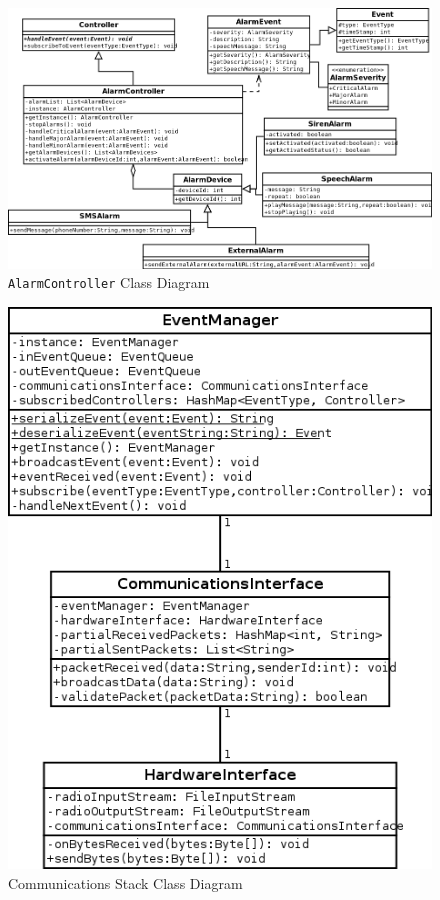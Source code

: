 \documentclass{report}
\begin{document}
\begin{landscape}
\begin{figure}[p]
    \caption{\texttt{AlarmController} Class Diagram}
    \label{fig:alarm_controller_class_diagram}
    \includegraphics[scale=0.5]{alarm_controller_class_diagram.png}
\end{figure}
\end{landscape}

\begin{figure}[p]
    \caption{Communications Stack Class Diagram}
    \label{fig:communications_stack_class_diagram}
    \includegraphics[scale=0.5]{communication_stack_class_diagram}
\end{figure}
\end{document}
